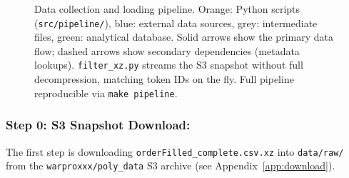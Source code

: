 \documentclass[11pt]{article}
\begin{document}
\begin{figure}[H]
\caption{Data collection and loading pipeline. Orange: Python scripts
         (\texttt{src/pipeline/}), blue: external data sources, grey:
         intermediate files, green: analytical database.
         Solid arrows show the primary data flow; dashed arrows show
         secondary dependencies (metadata lookups).
         \texttt{filter\_xz.py} streams the S3 snapshot without full
         decompression, matching token IDs on the fly.
         Full pipeline reproducible via \texttt{make pipeline}.}
\label{fig:pipeline}
\end{figure}


\newpage

\subsubsection*{Step 0: S3 Snapshot Download:}

The first step is downloading \texttt{orderFilled\_complete.csv.xz}
into \texttt{data/raw/} from the \texttt{warproxxx/poly\_data} S3
archive (see Appendix~\ref{app:download}).
\end{document}
